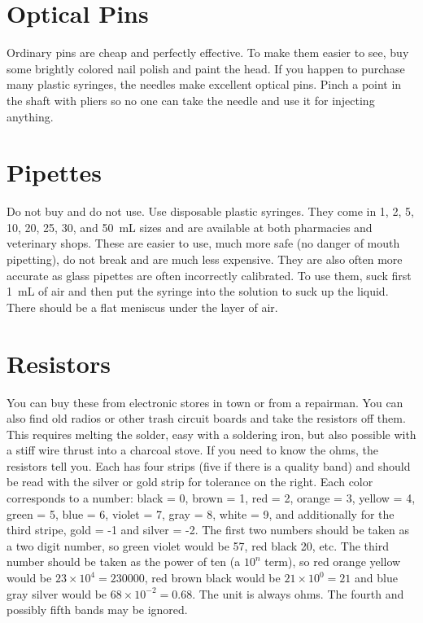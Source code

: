 \section{Optical Pins}
\label{sec:optical-pins}
Ordinary pins are cheap and perfectly effective. 
To make them easier to see, 
buy some brightly colored nail polish and paint the head. 
If you happen to purchase many plastic syringes, 
the needles make excellent optical pins. 
Pinch a point in the shaft with pliers so no one can take the needle 
and use it for injecting anything.

\section{Pipettes}
\label{sec:pipettes}
Do not buy and do not use. 
Use disposable plastic syringes. 
They come in 1, 
2, 
5, 
10, 
20, 
25, 
30, 
and 50~mL sizes and are available at both pharmacies and veterinary shops. 
These are easier to use, 
much more safe (no danger of mouth pipetting), 
do not break and are much less expensive. 
They are also often more accurate 
as glass pipettes are often incorrectly calibrated. 
To use them, 
suck first 1~mL of air and then put the syringe into the solution to suck up the liquid. 
There should be a flat meniscus under the layer of air.

\section{Resistors}
\label{sec:resistors}
You can buy these from electronic stores in town or from a repairman. 
You can also find old radios or other trash circuit boards 
and take the resistors off them. 
This requires melting the solder, 
easy with a soldering iron, 
but also possible with a stiff wire thrust into a charcoal stove. 
If you need to know the ohms, 
the resistors tell you. 
Each has four strips (five if there is a quality band) 
and should be read with the silver or gold strip for tolerance on the right. 
Each color corresponds to a number: black = 0, 
brown = 1, 
red = 2, 
orange = 3, 
yellow = 4, 
green = 5, 
blue = 6, 
violet = 7, 
gray = 8, 
white = 9, 
and additionally for the third stripe, 
gold = -1 and silver = -2. 
The first two numbers should be taken as a two digit number, 
so green violet would be 57, 
red black 20, 
etc. 
The third number should be taken as the power of ten (a $ 10^{n} $ term), 
so red orange yellow would be $ 23 \times 10^{4} = 230000 $, 
red brown black would be $ 21 \times 10^{0} = 21 $ 
and blue gray silver would be $ 68 \times 10^{-2} = 0.68 $. 
The unit is always ohms. 
The fourth and possibly fifth bands may be ignored.

